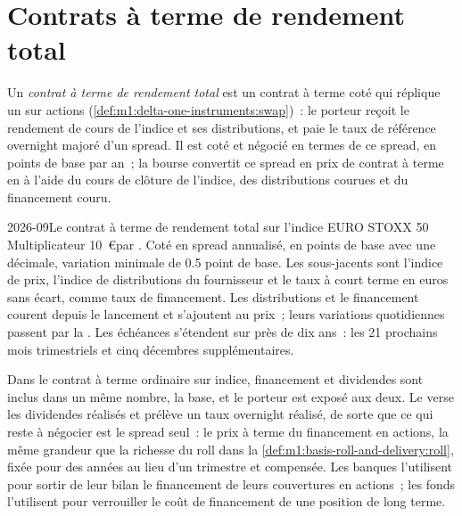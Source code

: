 \section{Contrats à terme de rendement total}

\begin{definition}\label{def:m1:index-and-single-stock-futures-worldwide:trf}
Un \emph{contrat à terme de rendement total} est un contrat à terme coté
qui réplique un  sur actions
(\cref{def:m1:delta-one-instruments:swap})~: le porteur reçoit le rendement de cours de l'indice
et ses distributions, et paie le taux de référence overnight majoré
d'un spread. Il est coté et négocié en termes de ce spread, en points de base par an~;
la bourse convertit ce spread en prix de contrat à terme en  à l'aide
du cours de clôture de l'indice, des distributions courues et du financement couru.
\end{definition}

\begin{dated}{2026-09}{Le contrat à terme de rendement total sur l'indice EURO STOXX 50}\label{dat:m1:index-and-single-stock-futures-worldwide:tesx}
Multiplicateur 10~\euro par . Coté en spread annualisé, en points de base
avec une décimale, variation minimale de 0.5 point de base. Les sous-jacents sont
l'indice de prix, l'indice de distributions du fournisseur et le taux à court terme en euros
sans écart, comme taux de financement. Les distributions et le financement courent depuis le
lancement et s'ajoutent au prix~; leurs variations quotidiennes passent par la . Les échéances s'étendent sur près de dix ans~: les 21 prochains mois trimestriels
et cinq décembres supplémentaires.
\end{dated}

Dans le contrat à terme ordinaire sur indice, financement et dividendes sont inclus dans un même nombre,
la base, et le porteur est exposé aux deux. Le  verse
les dividendes réalisés et prélève un taux overnight réalisé, de sorte que ce qui reste à négocier est
le spread seul~: le prix à terme du financement en actions, la
même grandeur que la richesse du roll dans
la \cref{def:m1:basis-roll-and-delivery:roll}, fixée pour des années au lieu d'un
trimestre et compensée. Les banques l'utilisent pour sortir de leur bilan le financement de leurs
couvertures en actions~; les fonds l'utilisent pour verrouiller le coût de financement de
une position de long terme.

